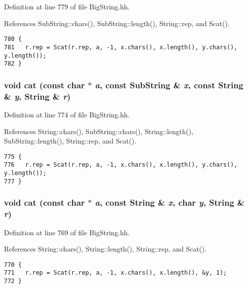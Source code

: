 Definition at line 779 of file Big\-String.hh.

References Sub\-String::chars(), Sub\-String::length(), String::rep, and Scat().



\footnotesize\begin{verbatim}780 {
781   r.rep = Scat(r.rep, a, -1, x.chars(), x.length(), y.chars(), y.length());
782 }
\end{verbatim}\normalsize 
{}
\subsubsection{\setlength{\rightskip}{0pt plus 5cm}void cat (const char $\ast$ {\em a}, const {\bf Sub\-String} \& {\em x}, const {\bf String} \& {\em y}, {\bf String} \& {\em r})\hspace{0.3cm}{\tt  [inline]}}\label{BigString_8hh_a62}




Definition at line 774 of file Big\-String.hh.

References String::chars(), Sub\-String::chars(), String::length(), Sub\-String::length(), String::rep, and Scat().



\footnotesize\begin{verbatim}775 {
776   r.rep = Scat(r.rep, a, -1, x.chars(), x.length(), y.chars(), y.length());
777 }
\end{verbatim}\normalsize 
{}
\subsubsection{\setlength{\rightskip}{0pt plus 5cm}void cat (const char $\ast$ {\em a}, const {\bf String} \& {\em x}, char {\em y}, {\bf String} \& {\em r})\hspace{0.3cm}{\tt  [inline]}}\label{BigString_8hh_a61}




Definition at line 769 of file Big\-String.hh.

References String::chars(), String::length(), String::rep, and Scat().



\footnotesize\begin{verbatim}770 {
771   r.rep = Scat(r.rep, a, -1, x.chars(), x.length(), &y, 1);
772 }
\end{verbatim}\normalsize 
{}
